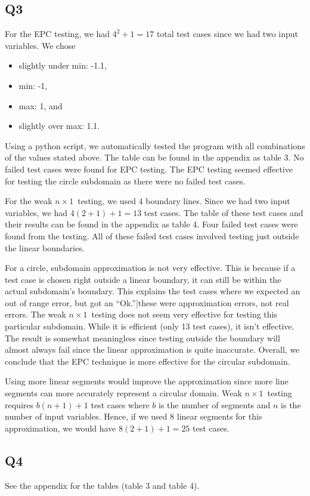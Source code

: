 \documentclass[12pt, letterpaper, titlepage]{article}
\newcommand{\nx}{$n\times1$}
\begin{document}
\subsection*{Q3}
For the EPC testing, we had $4^2+1=17$ total test cases since we had two input variables. We chose 
\begin{itemize}
    \item slightly under min: -1.1,
    \item min: -1,
    \item max: 1, and
    \item slightly over max: 1.1.
\end{itemize}
Using a python script, we automatically tested the program with all combinations of the values stated above. The table can be found in the appendix as table 3. No failed test cases were found for EPC testing. The EPC testing seemed effective for testing the circle subdomain as there were no failed test cases.

For the weak \nx\ testing, we used 4 boundary lines. Since we had two input variables, we had $4(2+1)+1=13$ test cases. The table of these test cases and their results can be found in the appendix as table 4. Four failed test cases were found from the testing. All of these failed test cases involved testing just outside the linear boundaries.

For a circle, subdomain approximation is not very effective. This is because if a test case is chosen right outside a linear boundary, it can still be within the actual subdomain's boundary. This explains the test cases where we expected an out of range error, but got an ``Ok.''|these were approximation errors, not real errors. The weak \nx\ testing does not seem very effective for testing this particular subdomain. While it is efficient (only 13 test cases), it isn't effective. The result is somewhat meaningless since testing outside the boundary will almost always fail since the linear approximation is quite inaccurate. Overall, we conclude that the EPC technique is more effective for the circular subdomain. 

Using more linear segments would improve the approximation since more line segments can more accurately represent a circular domain. Weak \nx\ testing requires $b(n+1)+1$ test cases where $b$ is the number of segments and $n$ is the number of input variables. Hence, if we used 8 linear segments for this approximation, we would have $8(2+1)+1=25$ test cases.

\subsection*{Q4}
See the appendix for the tables (table 3 and table 4).
\end{document}
